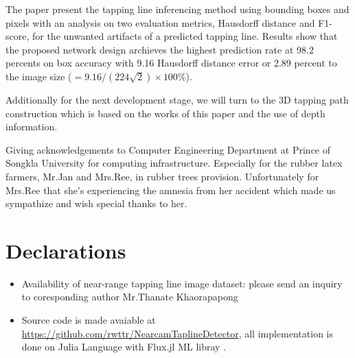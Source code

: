 \documentclass[default,pdflatex,iicol]{sn-jnl}%
\begin{document}
The paper present the tapping line inferencing method using bounding boxes and pixels with an analysis on two evaluation metrics, Hausdorff distance and F1-score, for the unwanted artifacts of a predicted tapping line. Results show that the proposed network design archieves the highest prediction rate at 98.2 percents on box accuracy with 9.16 Hausdorff distance error or 2.89 percent to the image size ($=9.16/(224\sqrt2)\times100\%$).

Additionally for the next development stage, we will turn to the 3D tapping path construction which is based on the works of this paper and the use of depth information.

\backmatter

Giving acknowledgements to Computer Engineering Department at Prince of Songkla University for computing infrastructure. Especially for the rubber latex farmers, Mr.Jan and Mrs.Ree, in rubber trees provision. Unfortunately for Mrs.Ree that she's experiencing the amnesia from her accident which made us sympathize and wish special thanks to her.

\section*{Declarations}
\begin{itemize}
\item Availability of near-range tapping line image dataset: please send an inquiry to coresponding author Mr.Thanate Khaorapapong
\item Source code is made avaiable at \url{https://github.com/rwttr/NearcamTaplineDetector}, all implementation is done on Julia Language with Flux.jl ML libray \cite{innes2018}.
\end{itemize}



\end{document}
